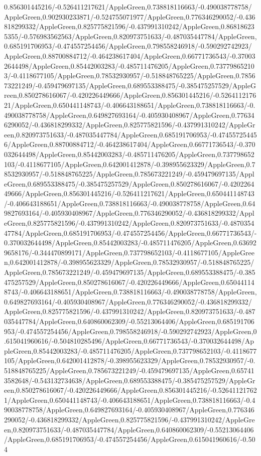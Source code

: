 {\begin{tikzternal}
{0.856301445216/-0.526411217621/AppleGreen,0.738818116663/-0.490038778758/AppleGreen,0.902930233871/-0.524755071977/AppleGreen,0.776346290052/-0.436818299332/AppleGreen,0.825775821596/-0.437991310242/AppleGreen,0.868186235355/-0.576983562563/AppleGreen,0.820973751633/-0.487035447784/AppleGreen,0.685191706953/-0.474557254456/AppleGreen,0.798558246918/-0.590292742923/AppleGreen,0.88700884712/-0.464238617404/AppleGreen,0.66771736543/-0.370032644498/AppleGreen,0.85442003283/-0.485711476205/AppleGreen,0.737798652103/-0.4118677105/AppleGreen,0.78532930957/-0.518848765225/AppleGreen,0.785673221249/-0.459479697135/AppleGreen,0.689553388475/-0.385475257529/AppleGreen,0.850278616067/-0.420226449666/AppleGreen,0.856301445216/-0.526411217621/AppleGreen,0.650441148743/-0.406643188651/AppleGreen,0.738818116663/-0.490038778758/AppleGreen,0.649827693164/-0.405930408967/AppleGreen,0.776346290052/-0.436818299332/AppleGreen,0.825775821596/-0.437991310242/AppleGreen,0.820973751633/-0.487035447784/AppleGreen,0.685191706953/-0.474557254456/AppleGreen,0.88700884712/-0.464238617404/AppleGreen,0.66771736543/-0.370032644498/AppleGreen,0.85442003283/-0.485711476205/AppleGreen,0.737798652103/-0.4118677105/AppleGreen,0.642001412878/-0.398955623329/AppleGreen,0.78532930957/-0.518848765225/AppleGreen,0.785673221249/-0.459479697135/AppleGreen,0.689553388475/-0.385475257529/AppleGreen,0.850278616067/-0.420226449666/AppleGreen,0.856301445216/-0.526411217621/AppleGreen,0.650441148743/-0.406643188651/AppleGreen,0.738818116663/-0.490038778758/AppleGreen,0.649827693164/-0.405930408967/AppleGreen,0.776346290052/-0.436818299332/AppleGreen,0.825775821596/-0.437991310242/AppleGreen,0.820973751633/-0.487035447784/AppleGreen,0.685191706953/-0.474557254456/AppleGreen,0.66771736543/-0.370032644498/AppleGreen,0.85442003283/-0.485711476205/AppleGreen,0.636929658176/-0.344470899171/AppleGreen,0.737798652103/-0.4118677105/AppleGreen,0.642001412878/-0.398955623329/AppleGreen,0.78532930957/-0.518848765225/AppleGreen,0.785673221249/-0.459479697135/AppleGreen,0.689553388475/-0.385475257529/AppleGreen,0.850278616067/-0.420226449666/AppleGreen,0.650441148743/-0.406643188651/AppleGreen,0.738818116663/-0.490038778758/AppleGreen,0.649827693164/-0.405930408967/AppleGreen,0.776346290052/-0.436818299332/AppleGreen,0.825775821596/-0.437991310242/AppleGreen,0.820973751633/-0.487035447784/AppleGreen,0.640860062309/-0.55213064406/AppleGreen,0.685191706953/-0.474557254456/AppleGreen,0.798558246918/-0.590292742923/AppleGreen,0.615041960616/-0.504810285496/AppleGreen,0.66771736543/-0.370032644498/AppleGreen,0.85442003283/-0.485711476205/AppleGreen,0.737798652103/-0.4118677105/AppleGreen,0.642001412878/-0.398955623329/AppleGreen,0.78532930957/-0.518848765225/AppleGreen,0.785673221249/-0.459479697135/AppleGreen,0.657413582648/-0.543132734638/AppleGreen,0.689553388475/-0.385475257529/AppleGreen,0.850278616067/-0.420226449666/AppleGreen,0.856301445216/-0.526411217621/AppleGreen,0.650441148743/-0.406643188651/AppleGreen,0.738818116663/-0.490038778758/AppleGreen,0.649827693164/-0.405930408967/AppleGreen,0.776346290052/-0.436818299332/AppleGreen,0.825775821596/-0.437991310242/AppleGreen,0.820973751633/-0.487035447784/AppleGreen,0.640860062309/-0.55213064406/AppleGreen,0.685191706953/-0.474557254456/AppleGreen,0.615041960616/-0.504}
\end{tikzternal}}
